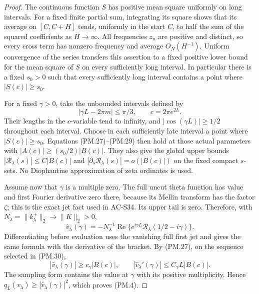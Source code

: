 \begin{proof}
The continuous function \(S\) has positive mean square uniformly on
long intervals.  For a fixed finite partial sum, integrating its square
shows that its average on \([C,C+H]\) tends, uniformly in the start
\(C\), to half the sum of the squared coefficients as \(H\to\infty\).
All frequencies \(z_n\) are positive and distinct, so every cross term
has nonzero frequency and average \(O_N(H^{-1})\).  Uniform convergence
of the series transfers this assertion to a fixed positive lower bound
for the mean square of \(S\) on every sufficiently long interval.
In particular there is a fixed \(s_0>0\) such that every sufficiently
long interval contains a point where \(|S(c)|\ge s_0\).

For a fixed \(\gamma>0\), take the unbounded intervals defined by
\[
 |\gamma L-2\pi m|\le\pi/3,\qquad c=2\pi e^{2L}.
 \tag{PM.30}
\]
Their lengths in the \(c\)-variable tend to infinity, and
\(|\cos(\gamma L)|\ge1/2\) throughout each interval.  Choose in each
sufficiently late interval a point where \(|S(c)|\ge s_0\).
Equations (PM.27)--(PM.29) then hold at those actual parameters with
\(|A(c)|\ge(s_0/2)|B(c)|\).  They also give the global upper bounds
\(|\mathcal R_\lambda(s)|\le C|B(c)|\) and
\(|\partial_s\mathcal R_\lambda(s)|=o(|B(c)|)\) on the fixed compact
\(s\)-sets.  No Diophantine approximation of zeta ordinates is used.

Assume now that \(\gamma\) is a multiple zero.  The full uncut theta
function has value and first Fourier derivative zero there, because
its Mellin transform has the factor \(\zeta\); this is the exact
jet fact used in AC-S34.  Its upper tail is zero.  Therefore, with
\(N_\lambda=\|k_\lambda^+\|_2\to\|K\|_2>0\),
\[
 \widehat v_\lambda(\gamma)
       =-N_\lambda^{-1}\operatorname{Re}
           \{e^{i\gamma L}\mathcal R_\lambda(1/2-i\gamma)\}.
 \tag{PM.31}
\]
Differentiating before evaluation uses the vanishing full first jet
and gives the same formula with the derivative of the bracket.
By (PM.27), on the sequence selected in (PM.30),
\[
 |\widehat v_\lambda(\gamma)|\ge c_\gamma |B(c)|,
 \qquad
 |\widehat v_\lambda'(\gamma)|\le C_\gamma L|B(c)|.
 \tag{PM.32}
\]
The sampling form contains the value at \(\gamma\) with its positive
multiplicity.  Hence \(q_L(v_\lambda)\ge|\widehat v_\lambda(\gamma)|^2\),
which proves (PM.4).


\end{proof}

